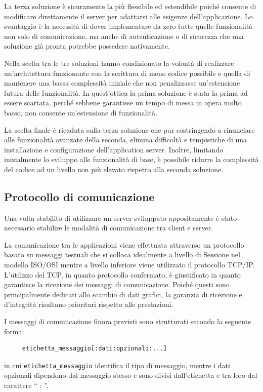 La terza soluzione \`e sicuramente la pi\`u flessibile ed estendibile poich\'e consente di modificare direttamente il server per adattarsi alle esigenze dell'applicazione. Lo svantaggio \`e la necessit\`a di dover implementare da zero tutte quelle funzionalit\`a non solo di comunicazione, ma anche di autenticazione o di sicurezza che una soluzione gi\`a pronta potrebbe possedere nativamente.

Nella scelta tra le tre soluzioni hanno condizionato la volont\`a di realizzare un'architettura funzionante con la scrittura di meno codice possibile e quella di mantenere una bassa complessit\`a iniziale che non penalizzasse un'estensione futura delle funzionalit\`a. In quest'ottica la prima soluzione \`e stata la prima ad essere scartata, perch\'e sebbene garantisse un tempo di messa in opera molto basso, non consente un'estensione di funzionalit\`a. 

La scelta finale \`e ricaduta sulla terza soluzione che pur costringendo a rinunciare alle funzionalit\`a avanzate della seconda, elimina difficolt\`a e tempistiche di una installazione e configurazione dell'application server. Inoltre, limitando inizialmente lo sviluppo alle funzionalit\`a di base, \`e possibile ridurre la complessit\`a del codice ad un livello non pi\`u elevato rispetto alla seconda soluzione.

\subsection{Protocollo di comunicazione}
\label{sub:comprotocol}
Una volta stabilito di utilizzare un server sviluppato appositamente \`e stato necessario stabilire le modalit\`a di comunicazione tra client e server. 

La comunicazione tra le applicazioni viene effettuata attraverso un protocollo basato su messaggi testuali che si colloca idealmente a livello di Sessione nel modello ISO/OSI \cite{book:computernetworking} mentre a livello inferiore viene utilizzato il protocollo TCP/IP.
L'utilizzo del TCP, in quanto protocollo confermato, \`e giustificato in quanto garantisce la ricezione dei messaggi di comunicazione. Poich\'e questi sono principalmente dedicati allo scambio di dati grafici, la garanzia di ricezione e d'integrit\`a risultano prioritari rispetto alle prestazioni.

I messaggi di comunicazione finora previsti sono strutturati secondo la seguente forma:
\begin{verbatim}
     etichetta_messaggio[:dati:opzionali:...]
\end{verbatim}
in cui \texttt{etichetta\_messaggio} identifica il tipo di messaggio, mentre i dati opzionali dipendono dal messaggio stesso e sono divisi dall'etichetta e tra loro dal carattere `` : ''.

